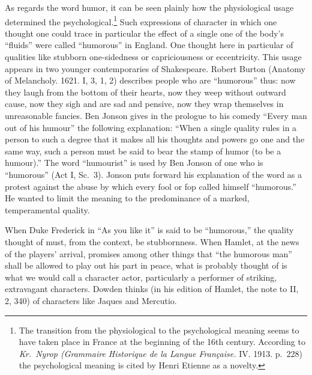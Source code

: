\documentclass[12pt]{book}
\newcommand{\opage}[1]{\marginnote{\footnotesize\textit{[#1]}}}
\begin{document}
As regards the word humor, it can be seen plainly how the physiological usage
determined the psychological.\footnote{The transition from the physiological to
the psychological meaning seems to have taken place in France at the beginning of
the 16th century. According to \textit{Kr.\ Nyrop (Grammaire Historique de la
Langue Française.} IV. 1913. p.~228) the psychological meaning is cited by Henri
Etienne as a novelty.} Such expressions of character in which one thought one
could trace in particular the effect of a single one of the body's ``fluids'' were
called ``humorous'' in England. One thought here in particular of qualities like
stubborn one-sidedness or capriciousness or eccentricity. This usage appears in
two younger contemporaries of Shakespeare. Robert Burton (Anatomy of Melancholy.
1621. I, 3, 1, 2) describes people who are ``humorous'' thus: now they laugh from
the bottom of their hearts, now they weep without outward cause, now they sigh and
are sad and pensive, now they wrap themselves in unreasonable fancies. Ben Jonson
gives in the prologue to his comedy ``Every man out of his humour'' the following
explanation: ``When a single quality rules in a person to such a degree that it
makes all his thoughts and powers go one and the same way, such a person must be
said to bear the stamp of humor (to be a humour).'' The word ``humourist'' is used
by Ben Jonson of one who is ``humorous'' (Act I, Sc.~3). Jonson puts forward his
explanation of the word as a protest against the abuse by which every fool or fop
called himself ``humorous.'' He wanted to limit the meaning to the predominance of
a marked, temperamental quality.

When Duke Frederick in ``As you like it'' is said to be
``hu\opage{42}morous,'' the quality thought of must, from the context, be
stubbornness. When Hamlet, at the news of the players' arrival, promises among
other things that ``the humorous man'' shall be allowed to play out his part in
peace, what is probably thought of is what we would call a character actor,
particularly a performer of striking, extravagant characters. Dowden thinks (in
his edition of Hamlet, the note to II, 2, 340) of characters like Jaques and
Mercutio.
\end{document}
